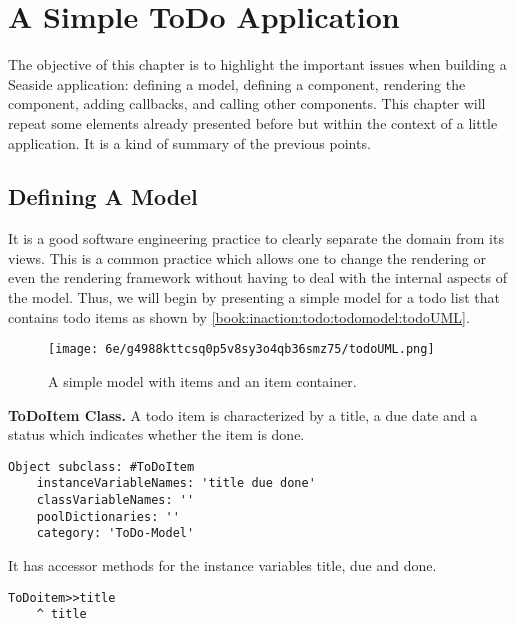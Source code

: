 \documentclass[a4paper,10pt,twoside]{book}
\newcommand{\ct}[1]{{\small\ttfamily\textup{#1}}}
\begin{document}
\chapter{A Simple ToDo Application}
\label{book:inaction:todo}

The objective of this chapter is to highlight the important issues when building a Seaside application: defining a model, defining a component, rendering the component, adding callbacks, and calling other components. This chapter will repeat some elements already presented before but within the context of a little application. It is a kind of summary of the previous points.

\section{Defining A Model}
\label{book:inaction:todo:todomodel}

It is a good software engineering practice to clearly separate the domain from its views. This is a common practice which allows one to change the rendering or even the rendering framework without having to deal with the internal aspects of the model. Thus, we will begin by presenting a simple model for a todo list that contains todo items as shown by \autoref{book:inaction:todo:todomodel:todoUML}.

\begin{figure}[h!tbp]
	\begin{center}
		\texttt{[image: 6e/g4988kttcsq0p5v8sy3o4qb36smz75/todoUML.png]}
		\caption{A simple model with items and an item container.\label{book:inaction:todo:todomodel:todoUML}}
	\end{center}
\end{figure}


\textbf{ToDoItem Class.} A todo item is characterized by a title, a due date and a status which
indicates whether the item is done.

\begin{lstlisting}
Object subclass: #ToDoItem
    instanceVariableNames: 'title due done'
    classVariableNames: ''
    poolDictionaries: ''
    category: 'ToDo-Model'
\end{lstlisting}

It has accessor methods for the instance variables \ct{title}, \ct{due} and \ct{done}.

\begin{lstlisting}
ToDoitem>>title
    ^ title
\end{lstlisting}
\end{document}
